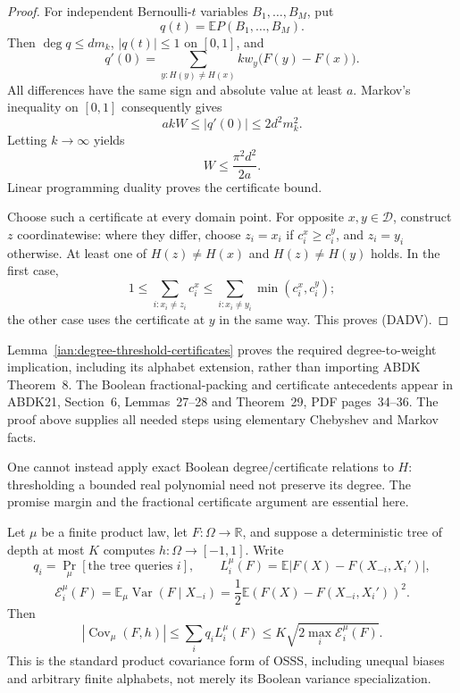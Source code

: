 \begin{proof}
For independent Bernoulli-\(t\) variables \(B_1,\ldots,B_M\), put
\[
 q(t)=\mathbb E P(B_1,\ldots,B_M).
\]
Then \(\deg q\le dm_k\), \(|q(t)|\le1\) on \([0,1]\), and
\[
 q'(0)=\sum_{y:H(y)\ne H(x)}kw_y\bigl(F(y)-F(x)\bigr).
\]
All differences have the same sign and absolute value at least
\(a\). Markov's inequality on \([0,1]\) consequently gives
\[
 akW\le |q'(0)|\le2d^2m_k^2.
\]
Letting \(k\to\infty\) yields
\[
 W\le\frac{\pi^2d^2}{2a}.
\]
Linear programming duality proves the certificate bound.

Choose such a certificate at every domain point. For opposite
\(x,y\in\mathcal D\), construct \(z\) coordinatewise: where they
differ, choose \(z_i=x_i\) if \(c_i^x\ge c_i^y\), and \(z_i=y_i\)
otherwise. At least one of \(H(z)\ne H(x)\) and \(H(z)\ne H(y)\)
holds. In the first case,
\[
 1\le\sum_{i:x_i\ne z_i}c_i^x
 \le\sum_{i:x_i\ne y_i}\min(c_i^x,c_i^y);
\]
the other case uses the certificate at \(y\) in the same way.
This proves (DADV).
\end{proof}

\begin{remark}
\label{ian:degree-certificate-provenance}
Lemma~\ref{ian:degree-threshold-certificates} proves the required
degree-to-weight implication, including its alphabet extension,
rather than importing ABDK Theorem~8. The Boolean fractional-packing
and certificate antecedents appear in ABDK21, Section~6,
Lemmas~27--28 and Theorem~29, PDF pages~34--36.
The proof above supplies all needed steps using elementary
Chebyshev and Markov facts.

One cannot instead apply exact Boolean degree/certificate relations
to \(H\): thresholding a bounded real polynomial need not preserve
its degree. The promise margin and the fractional certificate
argument are essential here.
\end{remark}

\begin{lemma}
\label{ian:product-osss-covariance}
Let \(\mu\) be a finite product law, let \(F:\Omega\to\mathbb R\),
and suppose a deterministic tree of depth at most \(K\) computes
\(h:\Omega\to[-1,1]\). Write
\[
 q_i=\Pr_\mu[\text{the tree queries }i],\qquad
 L_i^\mu(F)=\mathbb E|F(X)-F(X_{-i},X_i')|,
\]
\[
 \mathcal E_i^\mu(F)=
 \mathbb E_\mu\operatorname{Var}(F\mid X_{-i})
 =\frac12\mathbb E(F(X)-F(X_{-i},X_i'))^2.
\]
Then
\[
 |\operatorname{Cov}_\mu(F,h)|
 \le\sum_iq_iL_i^\mu(F)
 \le K\sqrt{2\max_i\mathcal E_i^\mu(F)}.
 \tag{OSSS-C}
\]
This is the standard product covariance form of OSSS, including
unequal biases and arbitrary finite alphabets, not merely its
Boolean variance specialization.
\end{lemma}

